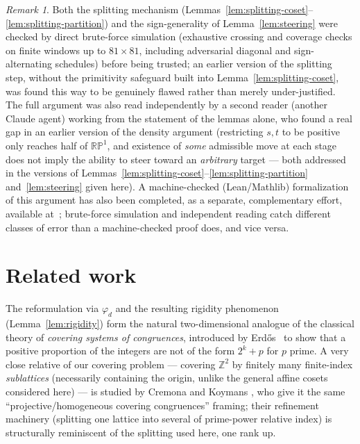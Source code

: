 \documentclass[a4paper,11pt,oneside,reqno]{amsart}
\theoremstyle{definition}
\theoremstyle{remark}
\newtheorem{remark}[definition]{Remark}
\theoremstyle{plain}
\newcommand{\Z}{\mathbb{Z}}
\newcommand{\RP}{\mathbb{RP}^1}
\begin{document}
\begin{remark}
  Both the splitting mechanism (Lemmas~\ref{lem:splitting-coset}--\ref{lem:splitting-partition})
  and the sign-generality of Lemma~\ref{lem:steering} were checked by direct brute-force simulation
  (exhaustive crossing and coverage checks on finite windows up to \(81\times81\), including
  adversarial diagonal and sign-alternating schedules) before being trusted; an earlier version of
  the splitting step, without the primitivity safeguard built into
  Lemma~\ref{lem:splitting-coset}, was found this way to be genuinely flawed rather than merely
  under-justified. The full argument was also read independently by a second reader (another
  Claude agent) working from the statement of the lemmas alone, who found a real gap in an earlier
  version of the density argument (restricting \(s,t\) to be positive only reaches half of \(\RP\),
  and existence of \emph{some} admissible move at each stage does not imply the ability to steer
  toward an \emph{arbitrary} target --- both addressed in the versions of
  Lemmas~\ref{lem:splitting-coset}--\ref{lem:splitting-partition} and~\ref{lem:steering} given
  here). A machine-checked (Lean/Mathlib) formalization of this argument has also been completed,
  as a separate, complementary effort, available at~\cite{gitrepo}; brute-force simulation and
  independent reading catch different classes of error than a machine-checked proof does, and vice
  versa.
\end{remark}

\section{Related work}

The reformulation via \(\varphi_d\) and the resulting rigidity phenomenon (Lemma~\ref{lem:rigidity})
form the natural two-dimensional analogue of the classical theory of \emph{covering systems of
congruences}, introduced by Erd\H{o}s~\cite{Erdos1950} to show that a positive proportion of the
integers are not of the form \(2^k+p\) for \(p\) prime. A very close relative of our covering problem
--- covering \(\Z^2\) by finitely many finite-index \emph{sublattices} (necessarily containing the
origin, unlike the general affine cosets considered here) --- is studied by Cremona and Koymans
\cite{CremonaKoymans2026}, who give it the same ``projective/homogeneous covering congruences''
framing; their refinement machinery (splitting one lattice into several of prime-power relative
index) is structurally reminiscent of the splitting used here, one rank up.
\end{document}

